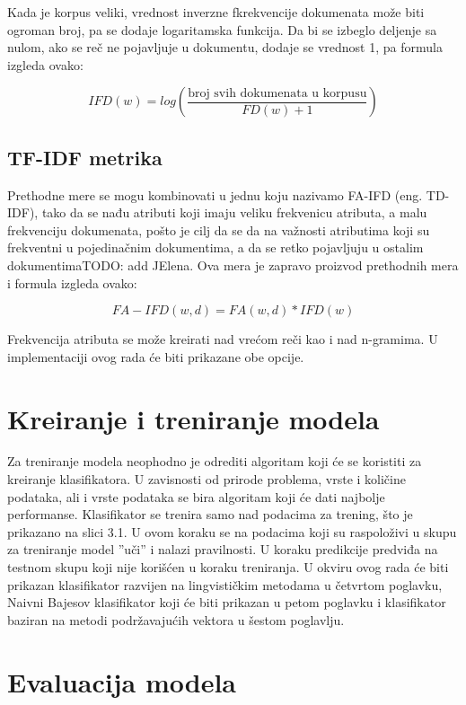 \documentclass[12pt,oneside]{memoir}
\begin{document}
Kada je korpus veliki,  vrednost inverzne fkrekvencije dokumenata može biti ogroman broj, pa se dodaje logaritamska funkcija.  Da bi se izbeglo deljenje sa nulom, ako se reč ne pojavljuje u dokumentu,  dodaje se vrednost 1, pa formula izgleda ovako:

\begin{equation}
	IFD(w) = log\left(\frac{\text{broj svih dokumenata u korpusu}}{FD(w) + 1}\right)
\end{equation}

\subsection{TF-IDF metrika}

Prethodne mere se mogu kombinovati u jednu koju nazivamo FA-IFD (eng.  TD-IDF), tako da se nađu atributi koji imaju veliku frekvenicu atributa,  a malu frekvenciju dokumenata, pošto je cilj da se da na važnosti atributima koji su frekventni u pojedinačnim dokumentima, a da se retko pojavljuju u ostalim dokumentimaTODO: add JElena.  Ova mera je zapravo proizvod prethodnih mera i formula izgleda ovako:

\begin{equation}
	FA-IFD(w, d) = FA(w,d) * IFD(w)
\end{equation}

Frekvencija atributa se može kreirati nad vrećom reči kao i nad n-gramima.  U implementaciji ovog rada će biti prikazane obe opcije.


\section{Kreiranje i treniranje modela}
Za treniranje modela neophodno je odrediti algoritam koji će se koristiti za kreiranje klasifikatora.  U zavisnosti od prirode problema,  vrste i količine podataka,  ali i vrste podataka se bira algoritam koji će dati najbolje performanse.  Klasifikator se trenira samo nad podacima za trening,  što je prikazano na slici 3.1.  U ovom koraku se na podacima koji su raspoloživi u skupu za treniranje model ”uči” i nalazi pravilnosti.   U koraku predikcije predviđa na testnom skupu koji nije korišćen u koraku treniranja.  
U okviru ovog rada će biti prikazan klasifikator razvijen na lingvističkim metodama u četvrtom poglavku,  Naivni Bajesov klasifikator koji će biti prikazan u petom poglavku i klasifikator baziran na metodi podržavajućih vektora u šestom poglavlju.  

\section{Evaluacija modela}
\end{document}
